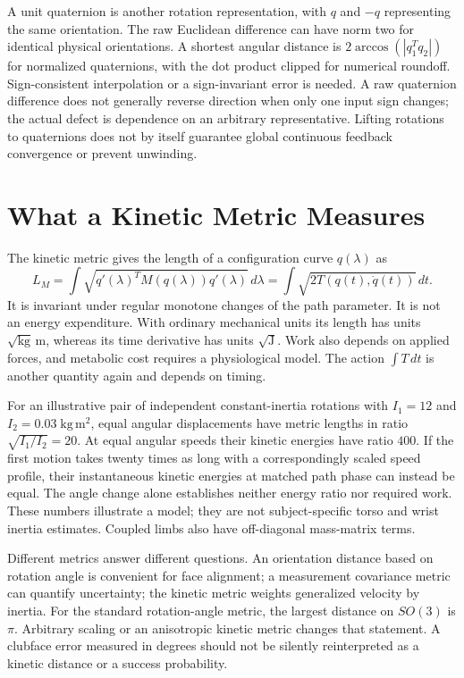 A unit quaternion is another rotation representation, with $q$ and $-q$
representing the same orientation. The raw Euclidean difference can have norm
two for identical physical orientations. A shortest angular distance is
$2\arccos(|q_1^Tq_2|)$ for normalized quaternions, with the dot product clipped
for numerical roundoff. Sign-consistent interpolation or a sign-invariant
error is needed. A raw quaternion difference does not generally reverse
direction when only one input sign changes; the actual defect is dependence
on an arbitrary representative. Lifting rotations to quaternions does not
by itself guarantee global continuous feedback convergence or prevent unwinding.

\section{What a Kinetic Metric Measures}

The kinetic metric gives the length of a configuration curve $q(\lambda)$ as
\begin{equation}\label{eq:manifold_metric_length}
 L_M=\int\sqrt{q'(\lambda)^TM(q(\lambda))q'(\lambda)}\,d\lambda
     =\int\sqrt{2T(q(t),\dot q(t))}\,dt.
\end{equation}
It is invariant under regular monotone changes of the path parameter. It is
not an energy expenditure. With ordinary mechanical units its length has
units $\sqrt{\mathrm{kg}}\,\mathrm m$, whereas its time derivative has units
$\sqrt{\mathrm J}$. Work also depends on applied forces, and metabolic cost
requires a physiological model. The action $\int T\,dt$ is another quantity
again and depends on timing.

For an illustrative pair of independent constant-inertia rotations with
$I_1=12$ and $I_2=0.03\;\mathrm{kg\,m^2}$, equal angular displacements have
metric lengths in ratio $\sqrt{I_1/I_2}=20$. At equal angular speeds their
kinetic energies have ratio $400$. If the first motion takes twenty times
as long with a correspondingly scaled speed profile, their instantaneous
kinetic energies at matched path phase can instead be equal. The angle
change alone establishes neither energy ratio nor required work. These
numbers illustrate a model; they are not subject-specific torso and wrist
inertia estimates. Coupled limbs also have off-diagonal mass-matrix terms.

Different metrics answer different questions. An orientation distance based
on rotation angle is convenient for face alignment; a measurement covariance
metric can quantify uncertainty; the kinetic metric weights generalized
velocity by inertia. For the standard rotation-angle metric, the largest
distance on $SO(3)$ is $\pi$. Arbitrary scaling or an anisotropic kinetic
metric changes that statement. A clubface error measured in degrees should
not be silently reinterpreted as a kinetic distance or a success probability.

